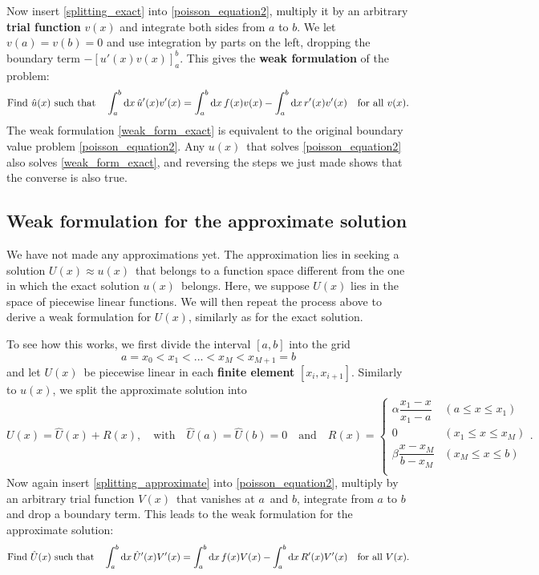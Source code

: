 Now insert \ref{splitting_exact} into \cref{poisson_equation2}, multiply it by an arbitrary \textbf{trial function} $v(x)$ and integrate both sides from $a$ to $b$.
We let $v(a) = v(b) = 0$ and use integration by parts on the left, dropping the boundary term $-[u'(x) v(x)]_a^b$.
This gives the \textbf{weak formulation} of the problem:
\newcommand{\weakform}[3]{
\text{Find} \,\, \hat{#1}(x) \,\, \text{such that}
\quad
\integral{\hat{#1}'(x) #2'(x)}{x}{a}{b} = \integral{f(x) #2(x)}{x}{a}{b} - \integral{#3'(x) #2'(x)}{x}{a}{b}
\quad
\text{for all} \,\, #2(x)
}
\begin{equation}
	\weakform{u}{v}{r}.
	\label{weak_form_exact}
\end{equation}
The weak formulation \ref{weak_form_exact} is equivalent to the original boundary value problem \ref{poisson_equation2}.
Any $u(x)$ that solves \ref{poisson_equation2} also solves \ref{weak_form_exact}, and reversing the steps we just made shows that the converse is also true.

\subsection{Weak formulation for the approximate solution}

We have not made any approximations yet.
The approximation lies in seeking a solution $U(x) \approx u(x)$ that belongs to a function space different from the one in which the exact solution $u(x)$ belongs.
Here, we suppose $U(x)$ lies in the space of piecewise linear functions.
We will then repeat the process above to derive a weak formulation for $U(x)$, similarly as for the exact solution.

To see how this works, we first divide the interval $[a, b]$ into the grid
\begin{equation}
	a = x_0 < x_1 < \dots < x_M < x_{M+1} = b
	\label{fem_grid}
\end{equation}
and let $U(x)$ be piecewise linear in each \textbf{finite element} $[x_i, x_{i+1}]$.
Similarly to $u(x)$, we split the approximate solution into
\begin{equation}
	U(x) = \hat{U}(x) + R(x), \quad \text{with} \quad \hat{U}(a) = \hat{U}(b) = 0 \quad \text{and} \quad R(x) = 
	\begin{cases}
		\alpha \dfrac{x_1-x}{x_1-a} & (a \leq x \leq x_1)   \\
		0                           & (x_1 \leq x \leq x_M) \\
		\beta  \dfrac{x-x_M}{b-x_M} & (x_M \leq x \leq b)   \\
	\end{cases}
	.
	\label{splitting_approximate}
\end{equation}
Now again insert \ref{splitting_approximate} into \ref{poisson_equation2}, multiply by an arbitrary trial function $V(x)$ that vanishes at $a$ and $b$, integrate from $a$ to $b$ and drop a boundary term.
This leads to the weak formulation for the approximate solution:
\begin{equation}
	\weakform{U}{V}{R}.
	\label{weak_form_approximate}
\end{equation}

